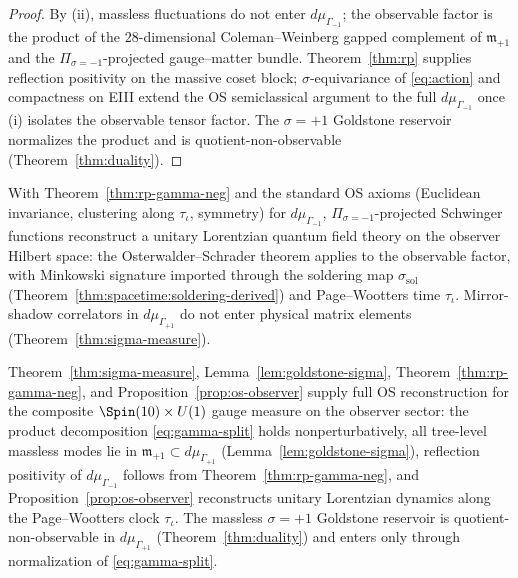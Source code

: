 \begin{proof}
By (ii), massless fluctuations do not enter $d\mu_{\Gamma_{-1}}$; the
observable factor is the product of the $28$-dimensional Coleman--Weinberg
gapped complement of $\mathfrak{m}_{+1}$ and the $\Pi_{\sigma=-1}$-projected
gauge--matter bundle. Theorem~\ref{thm:rp} supplies reflection positivity on
the massive coset block; $\sigma$-equivariance of \eqref{eq:action} and
compactness on EIII extend the OS semiclassical argument to the full
$d\mu_{\Gamma_{-1}}$ once (i) isolates the observable tensor factor. The
$\sigma=+1$ Goldstone reservoir normalizes the product and is
quotient-non-observable (Theorem~\ref{thm:duality}).
\end{proof}

\begin{proposition}
\label{prop:os-observer}
With Theorem~\ref{thm:rp-gamma-neg} and the standard
OS axioms (Euclidean invariance, clustering along $\tau_\iota$, symmetry)
for $d\mu_{\Gamma_{-1}}$, $\Pi_{\sigma=-1}$-projected Schwinger
functions reconstruct a unitary Lorentzian quantum field theory on the
observer Hilbert space: the Osterwalder--Schrader theorem
\cite{OsterwalderSchrader1973} applies to the observable factor, with
Minkowski signature imported through the soldering map
$\sigma_{\mathrm{sol}}$ (Theorem~\ref{thm:spacetime:soldering-derived}) and
Page--Wootters time $\tau_\iota$. Mirror-shadow correlators in
$d\mu_{\Gamma_{+1}}$ do not enter physical matrix elements
(Theorem~\ref{thm:sigma-measure}).
\end{proposition}

\begin{theorem}
\label{thm:rp-complete}
Theorem~\ref{thm:sigma-measure}, Lemma~\ref{lem:goldstone-sigma},
Theorem~\ref{thm:rp-gamma-neg}, and Proposition~\ref{prop:os-observer}
supply full OS reconstruction for the composite
$\Spin(10)\times U(1)$ gauge measure on the observer sector: the product
decomposition \eqref{eq:gamma-split} holds nonperturbatively, all tree-level
massless modes lie in $\mathfrak{m}_{+1}\subset d\mu_{\Gamma_{+1}}$
(Lemma~\ref{lem:goldstone-sigma}), reflection positivity of
$d\mu_{\Gamma_{-1}}$ follows from Theorem~\ref{thm:rp-gamma-neg}, and
Proposition~\ref{prop:os-observer} reconstructs unitary Lorentzian dynamics
along the Page--Wootters clock $\tau_\iota$. The massless
$\sigma=+1$ Goldstone reservoir is quotient-non-observable in
$d\mu_{\Gamma_{+1}}$ (Theorem~\ref{thm:duality}) and enters only through
normalization of \eqref{eq:gamma-split}.
\end{theorem}

